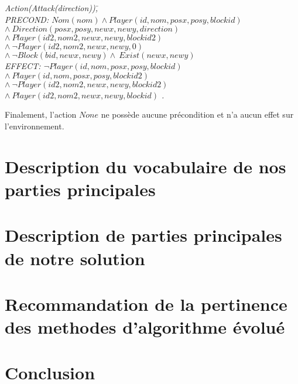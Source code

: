 \documentclass[12pt,english,frenchb,letterpaper]{article}
\begin{document}
\begin{tabbing}
\it{Action}\=\it{(Attack(direction))}\=,\\
\> PRECOND: \> $Nom(nom) \wedge Player(id,nom,posx,posy,blockid)$ \\ 
\> \> $  \wedge \ Direction(posx,posy,newx,newy,direction) $ \\
\> \> $  \wedge \ Player(id2,nom2,newx,newy,blockid2) $ \\
\> \> $  \wedge \ \lnot Player(id2,nom2,newx,newy,0) $ \\
\> \> $ \wedge\ \lnot Block(bid,newx,newy) \wedge \ Exist(newx,newy)$ \\               
\> EFFECT: \>$ \lnot Player(id,nom,posx,posy,blockid) $ \\
\>  \> $\wedge\ Player(id,nom,posx,posy,blockid2)$ \\
\>  \> $\wedge\ \lnot Player(id2,nom2,newx,newy,blockid2)$ \\
\>  \> $\wedge\ Player(id2,nom2,newx,newy,blockid)$ .\\
\end{tabbing}

Finalement, l'action $None$ ne possède aucune précondition et n'a aucun effet sur l'environnement.

\section{Description du vocabulaire de nos parties principales }

\section{Description de parties principales de notre solution}

\section{Recommandation de la pertinence des methodes d'algorithme évolué}

\section{Conclusion}
\end{document}
